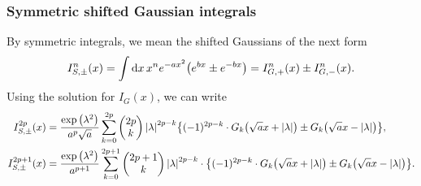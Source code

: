 \documentclass[aps,prl,preprint,groupedaddress,10pt]{revtex4-2}
\begin{document}
\subsubsection{Symmetric shifted Gaussian integrals}
By symmetric integrals, we mean the shifted Gaussians of the next form
\begin{equation}
    I_{S,\pm}^n(x)=\int\dd{x}x^ne^{-ax^2}\pqty{e^{bx}\pm e^{-bx}}=
    I_{G,+}^n(x)\pm I_{G,-}^n(x).
\end{equation}
Using the solution for $I_G(x)$, we can write
\begin{equation}
    \begin{split}
        I_{S,\pm}^{2p}(x)&=\frac{\exp\pqty{\lambda^2}}{a^p\sqrt{a}}
        \sum_{k=0}^{2p}\pmqty{2p\\k}\abs{\lambda}^{2p-k}
        \Bqty{(-1)^{2p-k}\cdot G_{k}\pqty{\sqrt{a}x+\abs{\lambda}}\pm
            G_{k}\pqty{\sqrt{a}x-\abs{\lambda}}},\\
        I_{S,\pm}^{2p+1}(x)&=\frac{\exp\pqty{\lambda^2}}{a^{p+1}}
        \sum_{k=0}^{2p+1}\pmqty{2p+1\\k}
        \abs{\lambda}^{2p-k}\cdot
        \Bqty{(-1)^{2p-k}\cdot G_{k}\pqty{\sqrt{a}x+\abs{\lambda}}\pm
            G_{k}\pqty{\sqrt{a}x-\abs{\lambda}}}.
    \end{split}
\end{equation}
\end{document}
